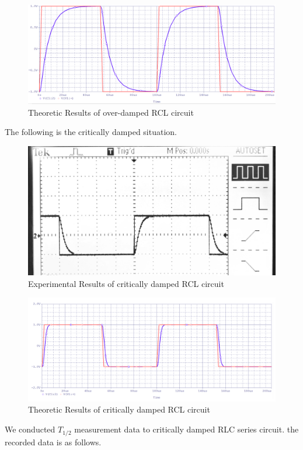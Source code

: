 \documentclass[a4paper]{article}
\begin{document}
\begin{figure}[H]
	\center
	\includegraphics[width=12cm]{over_theo.png}
	\caption{Theoretic Results of over-damped RCL circuit}
\end{figure}


The following is the critically damped situation.

\begin{figure}[H]
	\center
	\includegraphics[width=12cm]{critical_exp.jpg}
	\caption{Experimental Results of critically damped RCL circuit}
\end{figure}

\begin{figure}[H]
	\center
	\includegraphics[width=12cm]{critical_theo.png}
	\caption{Theoretic Results of critically damped RCL circuit}
\end{figure}


We conducted $T_{1/2}$ measurement data to critically damped RLC series circuit. the recorded data is as follows.
\end{document}
